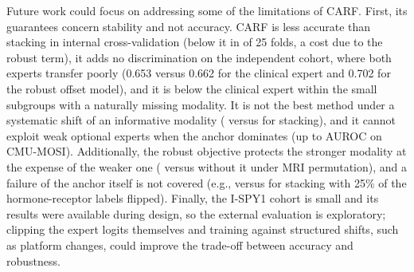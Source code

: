 \documentclass[runningheads]{llncs}
\begin{document}
Future work could focus on addressing some of the limitations of CARF. First, its guarantees concern stability and not accuracy. CARF is less accurate than stacking in internal cross-validation (below it in \IntFoldsWorse{} of 25 folds, a cost due to the robust term), it adds no discrimination on the independent cohort, where both experts transfer poorly (0.653 versus 0.662 for the clinical expert and 0.702 for the robust offset model), and it is below the clinical expert within the small subgroups with a naturally missing modality. It is not the best method under a systematic shift of an informative modality (\BlockShiftCarf{} versus \BlockShiftStack{} for stacking), and it cannot exploit weak optional experts when the anchor dominates (up to \MosiGap{} AUROC on CMU-MOSI). Additionally, the robust objective protects the stronger modality at the expense of the weaker one (\MriPermCarf{} versus \MriPermNoRobust{} without it under MRI permutation), and a failure of the anchor itself is not covered (e.g., \HrFlipCarf{} versus \HrFlipStack{} for stacking with 25\% of the hormone-receptor labels flipped). Finally, the I-SPY1 cohort is small and its results were available during design, so the external evaluation is exploratory; clipping the expert logits themselves and training against structured shifts, such as platform changes, could improve the trade-off between accuracy and robustness.



\end{document}
